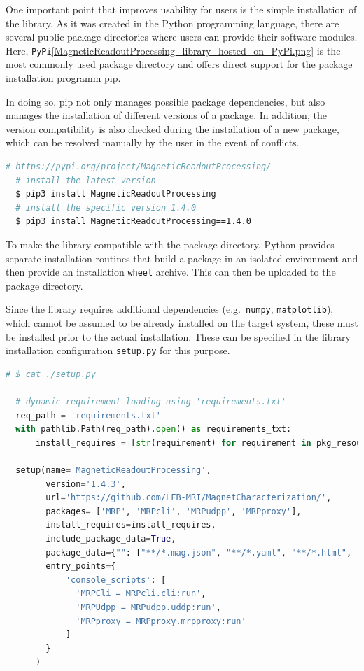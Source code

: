 One important point that improves usability for users is the simple
installation of the library. As it was created in the Python programming
language, there are several public package directories where users can
provide their software modules. Here,
\passthrough{\lstinline!PyPi!}\cite{PyPI}\ref{MagneticReadoutProcessing_library_hosted_on_PyPi.png}\cite{MagneticReadoutProcessingPyPI}
is the most commonly used package directory and offers direct support
for the package installation programm \gls{pip}.

In doing so, \gls{pip} not only manages possible package dependencies,
but also manages the installation of different versions of a package. In
addition, the version compatibility is also checked during the
installation of a new package, which can be resolved manually by the
user in the event of conflicts.

\begin{lstlisting}[language=bash]
  # https://pypi.org/project/MagneticReadoutProcessing/
  # install the latest version
  $ pip3 install MagneticReadoutProcessing
  # install the specific version 1.4.0
  $ pip3 install MagneticReadoutProcessing==1.4.0
\end{lstlisting}

To make the library compatible with the package directory, Python
provides separate installation routines that build a package in an
isolated environment and then provide an installation
\passthrough{\lstinline!wheel!} archive. This can then be uploaded to
the package directory.

Since the library requires additional dependencies
(e.g.~\passthrough{\lstinline!numpy!},
\passthrough{\lstinline!matplotlib!}), which cannot be assumed to be
already installed on the target system, these must be installed prior to
the actual installation. These can be specified in the library
installation configuration \passthrough{\lstinline!setup.py!} for this
purpose.

\begin{lstlisting}[language=Python]
  # $ cat ./setup.py

  # dynamic requirement loading using 'requirements.txt'
  req_path = 'requirements.txt'
  with pathlib.Path(req_path).open() as requirements_txt:
      install_requires = [str(requirement) for requirement in pkg_resources.parse_requirements(requirements_txt)]

  setup(name='MagneticReadoutProcessing',
        version='1.4.3',
        url='https://github.com/LFB-MRI/MagnetCharacterization/',
        packages= ['MRP', 'MRPcli', 'MRPudpp', 'MRPproxy'],
        install_requires=install_requires,
        include_package_data=True,
        package_data={"": ["**/*.mag.json", "**/*.yaml", "**/*.html", "**/*.js", "**/*.css", "**/*.md", "**/*.json", "**/*.ts", "**/*.xml"]},
        entry_points={
            'console_scripts': [
              'MRPCli = MRPcli.cli:run',
              'MRPUdpp = MRPudpp.uddp:run',
              'MRPproxy = MRPproxy.mrpproxy:run'
            ]
        }
      )
\end{lstlisting}

